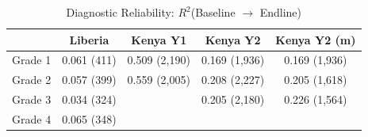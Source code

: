 \begin{table}[htbp]
\centering
\small
\caption{Diagnostic Reliability: $R^2$(Baseline $\to$ Endline)}
\label{tab:reliability}
\begin{tabular}{l*{4}{c}}
\toprule
 & Liberia & Kenya Y1 & Kenya Y2 & Kenya Y2 (m) \\
\midrule
Grade 1 & 0.061 (411) & 0.509 (2,190) & 0.169 (1,936) & 0.169 (1,936) \\
Grade 2 & 0.057 (399) & 0.559 (2,005) & 0.208 (2,227) & 0.205 (1,618) \\
Grade 3 & 0.034 (324) &  & 0.205 (2,180) & 0.226 (1,564) \\
Grade 4 & 0.065 (348) &  &  &  \\
\bottomrule
\end{tabular}
\par\smallskip{}
\end{table}